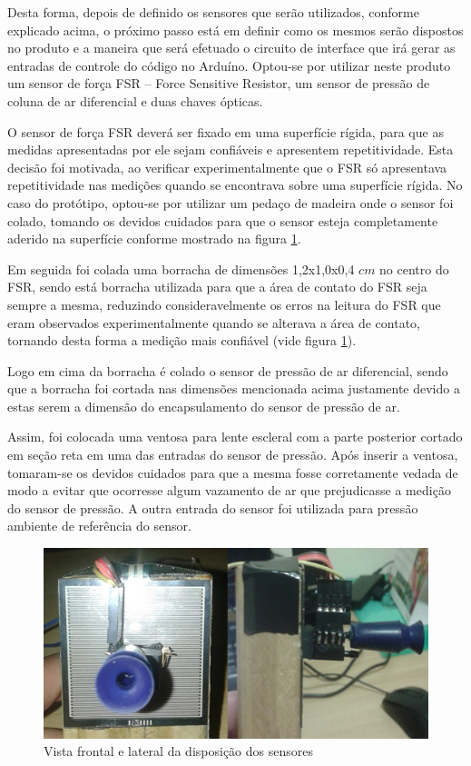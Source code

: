 Desta forma, depois de definido os sensores que serão utilizados, conforme explicado acima, o próximo passo está em definir como os mesmos serão dispostos no produto e a maneira que será efetuado o circuito de interface que irá gerar as entradas de controle do código no Arduíno. Optou-se por utilizar neste produto um sensor de força FSR – Force Sensitive Resistor, um sensor de pressão de coluna de ar diferencial e duas chaves ópticas. 

O sensor de força FSR deverá ser fixado em uma superfície rígida, para que as medidas apresentadas por ele sejam confiáveis e apresentem repetitividade. Esta decisão foi motivada, ao verificar experimentalmente que o FSR só apresentava repetitividade nas medições quando se encontrava sobre uma superfície rígida. No caso do protótipo, optou-se por utilizar um pedaço de madeira onde o sensor foi colado, tomando os devidos cuidados para que o sensor esteja completamente aderido na superfície conforme mostrado na figura \ref{visaofl}. 

Em seguida foi colada uma borracha de dimensões 1,2x1,0x0,4 $cm$ no centro do FSR, sendo está borracha utilizada para que a área de contato do FSR seja sempre a mesma, reduzindo consideravelmente os erros na leitura do FSR que eram observados experimentalmente quando se alterava a área de contato, tornando desta forma a medição mais confiável (vide figura \ref{visaofl}). 

Logo em cima da borracha é colado o sensor de pressão de ar diferencial, sendo que a borracha foi cortada nas dimensões mencionada acima justamente devido a estas serem a dimensão do encapsulamento do sensor de pressão de ar. 

Assim, foi colocada uma ventosa para lente escleral com a parte posterior cortado em seção reta em uma das entradas do sensor de pressão. Após inserir a ventosa, tomaram-se os devidos cuidados para que a mesma fosse corretamente vedada de modo a evitar que ocorresse algum vazamento de ar que prejudicasse a medição do sensor de pressão. A outra entrada do sensor foi utilizada para pressão ambiente de referência do sensor.

\begin{figure}[H]
		\centering
			\includegraphics[scale=1.0]{figuras/visaofl.png}
		\caption{Vista frontal e lateral da disposição dos sensores}
		\label{visaofl}
\end{figure}

